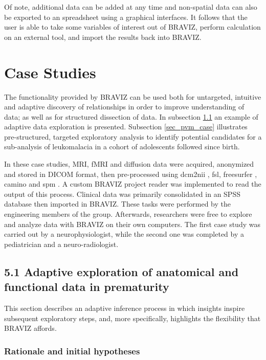 \documentclass{frontiersHLTH}
\begin{document}
Of note, additional data can be added at any time and non-spatial data can also be exported to an spreadsheet using a graphical interfaces. It follows that the user is able to take some variables of interest out of BRAVIZ, perform calculation on an external tool, and import the results back into BRAVIZ.




\section{Case Studies}
\label{case_studies}
The functionality provided by BRAVIZ can be used both for untargeted, intuitive and adaptive discovery of relationships in order to improve understanding of data; as well as for structured dissection of data. In subsection \ref{sec_case_cyril} an example of adaptive data exploration is presented. Subsection \ref{sec_pvm_case} illustrates pre-structured, targeted exploratory analysis to identify potential candidates for a sub-analysis of leukomalacia in a cohort of adolescents followed since birth. 

In these case studies, MRI, fMRI and diffusion data were acquired, anonymized and stored in DICOM format, then pre-processed using dcm2nii \cite{rorden_mricron_2007}, fsl\cite{jenkinson_fsl_2012}, freesurfer \cite{fischl_freesurfer_2012}, camino\cite{cook_camino:_2006} and spm \cite{friston_statistical_2007}. A custom BRAVIZ project reader was implemented to read the output of this process. 
Clinical data was primarily consolidated in an SPSS database then imported in BRAVIZ. These tasks were performed by the engineering members of the group. Afterwards, researchers were free to explore and analyze data with BRAVIZ on their own computers. The first case study was carried out by a neurophysiologist, while the second one was completed by a  pediatrician and a neuro-radiologist. 
	
 
\subsection{5.1 Adaptive exploration of anatomical and functional data in prematurity}
\label{sec_case_cyril}

This section describes an adaptive inference process in which insights inspire subsequent exploratory steps, and, more specifically, highlights the flexibility that BRAVIZ affords.

\subsubsection{Rationale and initial hypotheses}
\end{document}
